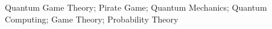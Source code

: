 \begin{keywords}
Quantum Game Theory; Pirate Game; Quantum Mechanics; Quantum Computing; Game Theory; Probability Theory
\end{keywords}
\clearpage
\thispagestyle{empty}
\cleardoublepage